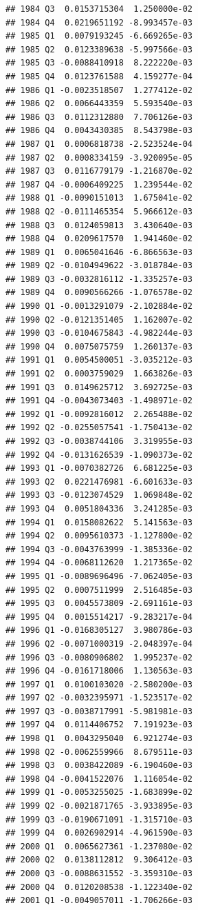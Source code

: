 \documentclass[12pt,a4paper,]{article}
\newcommand{\0}{\mathbf{0}}
\begin{document}
\begin{verbatim}
## 1984 Q3  0.0153715304  1.250000e-02
## 1984 Q4  0.0219651192 -8.993457e-03
## 1985 Q1  0.0079193245 -6.669265e-03
## 1985 Q2  0.0123389638 -5.997566e-03
## 1985 Q3 -0.0088410918  8.222220e-03
## 1985 Q4  0.0123761588  4.159277e-04
## 1986 Q1 -0.0023518507  1.277412e-02
## 1986 Q2  0.0066443359  5.593540e-03
## 1986 Q3  0.0112312880  7.706126e-03
## 1986 Q4  0.0043430385  8.543798e-03
## 1987 Q1  0.0006818738 -2.523524e-04
## 1987 Q2  0.0008334159 -3.920095e-05
## 1987 Q3  0.0116779179 -1.216870e-02
## 1987 Q4 -0.0006409225  1.239544e-02
## 1988 Q1 -0.0090151013  1.675041e-02
## 1988 Q2 -0.0111465354  5.966612e-03
## 1988 Q3  0.0124059813  3.430640e-03
## 1988 Q4  0.0209617570  1.941460e-02
## 1989 Q1  0.0065041646 -6.866563e-03
## 1989 Q2 -0.0104949622 -3.018784e-03
## 1989 Q3 -0.0032816112 -1.335257e-03
## 1989 Q4  0.0090566266 -1.076578e-02
## 1990 Q1 -0.0013291079 -2.102884e-02
## 1990 Q2 -0.0121351405  1.162007e-02
## 1990 Q3 -0.0104675843 -4.982244e-03
## 1990 Q4  0.0075075759  1.260137e-03
## 1991 Q1  0.0054500051 -3.035212e-03
## 1991 Q2  0.0003759029  1.663826e-03
## 1991 Q3  0.0149625712  3.692725e-03
## 1991 Q4 -0.0043073403 -1.498971e-02
## 1992 Q1 -0.0092816012  2.265488e-02
## 1992 Q2 -0.0255057541 -1.750413e-02
## 1992 Q3 -0.0038744106  3.319955e-03
## 1992 Q4 -0.0131626539 -1.090373e-02
## 1993 Q1 -0.0070382726  6.681225e-03
## 1993 Q2  0.0221476981 -6.601633e-03
## 1993 Q3 -0.0123074529  1.069848e-02
## 1993 Q4  0.0051804336  3.241285e-03
## 1994 Q1  0.0158082622  5.141563e-03
## 1994 Q2  0.0095610373 -1.127800e-02
## 1994 Q3 -0.0043763999 -1.385336e-02
## 1994 Q4 -0.0068112620  1.217365e-02
## 1995 Q1 -0.0089696496 -7.062405e-03
## 1995 Q2  0.0007511999  2.516485e-03
## 1995 Q3  0.0045573809 -2.691161e-03
## 1995 Q4  0.0015514217 -9.283217e-04
## 1996 Q1 -0.0168305127  3.980786e-03
## 1996 Q2 -0.0071000319 -2.048397e-04
## 1996 Q3 -0.0080906802  1.995237e-02
## 1996 Q4 -0.0161718006  1.130563e-03
## 1997 Q1  0.0100103020 -2.580200e-03
## 1997 Q2 -0.0032395971 -1.523517e-02
## 1997 Q3 -0.0038717991 -5.981981e-03
## 1997 Q4  0.0114406752  7.191923e-03
## 1998 Q1  0.0043295040  6.921274e-03
## 1998 Q2 -0.0062559966  8.679511e-03
## 1998 Q3  0.0038422089 -6.190460e-03
## 1998 Q4 -0.0041522076  1.116054e-02
## 1999 Q1 -0.0053255025 -1.683899e-02
## 1999 Q2 -0.0021871765 -3.933895e-03
## 1999 Q3 -0.0190671091 -1.315710e-03
## 1999 Q4  0.0026902914 -4.961590e-03
## 2000 Q1  0.0065627361 -1.237080e-02
## 2000 Q2  0.0138112812  9.306412e-03
## 2000 Q3 -0.0088631552 -3.359310e-03
## 2000 Q4  0.0120208538 -1.122340e-02
## 2001 Q1 -0.0049057011 -1.706266e-03

\end{verbatim}
\end{document}
